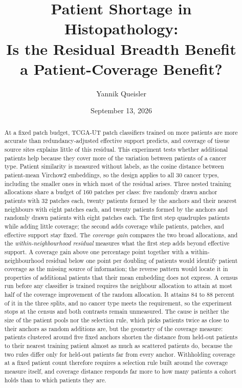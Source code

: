 \documentclass[11pt]{article}
\title{Patient Shortage in Histopathology:\\Is the Residual Breadth Benefit\\a Patient-Coverage Benefit?}
\author{Yannik Queisler}
\date{September 13, 2026}
\begin{document}
\raggedbottom
{}
\setlength{\emergencystretch}{2em}
\maketitle
\begin{abstract}
\noindent At a fixed patch budget, TCGA-UT patch classifiers trained on more patients are more accurate than redundancy-adjusted effective support predicts, and coverage of tissue source sites explains little of this residual. This experiment tests whether additional patients help because they cover more of the variation between patients of a cancer type. Patient similarity is measured without labels, as the cosine distance between patient-mean Virchow2 embeddings, so the design applies to all 30 cancer types, including the smaller ones in which most of the residual arises. Three nested training allocations share a budget of 160 patches per class: five randomly drawn anchor patients with 32 patches each, twenty patients formed by the anchors and their nearest neighbours with eight patches each, and twenty patients formed by the anchors and randomly drawn patients with eight patches each. The first step quadruples patients while adding little coverage; the second adds coverage while patients, patches, and effective support stay fixed. The \emph{coverage gain} compares the two broad allocations, and the \emph{within-neighbourhood residual} measures what the first step adds beyond effective support. A coverage gain above one percentage point together with a within-neighbourhood residual below one point per doubling of patients would identify patient coverage as the missing source of information; the reverse pattern would locate it in properties of additional patients that their mean embedding does not express. A census run before any classifier is trained requires the neighbour allocation to attain at most half of the coverage improvement of the random allocation. It attains 84 to 88 percent of it in the three splits, and no cancer type meets the requirement, so the experiment stops at the census and both contrasts remain unmeasured. The cause is neither the size of the patient pools nor the selection rule, which picks patients twice as close to their anchors as random additions are, but the geometry of the coverage measure: patients clustered around five fixed anchors shorten the distance from held-out patients to their nearest training patient almost as much as scattered patients do, because the two rules differ only for held-out patients far from every anchor. Withholding coverage at a fixed patient count therefore requires a selection rule built around the coverage measure itself, and coverage distance responds far more to how many patients a cohort holds than to which patients they are.
\end{abstract}
\setcounter{tocdepth}{1}
\tableofcontents
\clearpage
\end{document}
